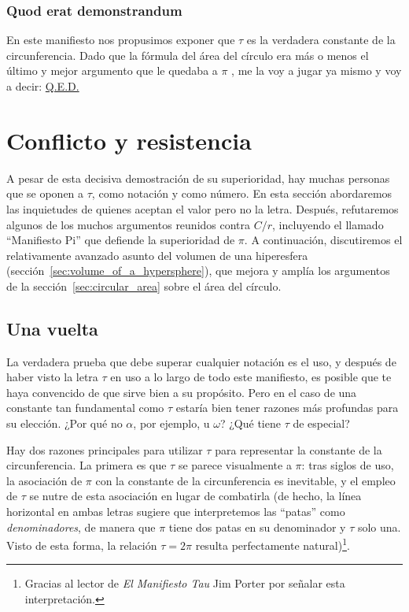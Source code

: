     \subsubsection{Quod erat demonstrandum} %
    \label{sec:quod_erat_demonstrandum}

En este manifiesto nos propusimos exponer que $\tau$ es la verdadera constante de la circunferencia. Dado que la fórmula del área del círculo era más o menos el último y mejor argumento que le quedaba a $\pi$ , me la voy a jugar ya mismo y voy a decir: \href{https://es.wikipedia.org/wiki/Quod_erat_demonstrandum}{Q.E.D.}



\section{Conflicto y resistencia} %
\label{sec:conflict_and_resistance}

A pesar de esta decisiva demostración de su superioridad, hay muchas personas que se oponen a $\tau$, como notación y como número. En esta sección abordaremos las inquietudes de quienes aceptan el valor pero no la letra. Después, refutaremos algunos de los muchos argumentos reunidos contra $C/r$, incluyendo el llamado ``Manifiesto Pi'' que defiende la superioridad de $\pi$. A continuación, discutiremos el relativamente avanzado asunto del volumen de una hiperesfera (sección~\ref{sec:volume_of_a_hypersphere}), que mejora y amplía los argumentos de la sección~\ref{sec:circular_area} sobre el área del círculo.

  \subsection{Una vuelta} %
  \label{sec:one_turn}

La verdadera prueba que debe superar cualquier notación es el uso, y después de haber visto la letra $\tau$ en uso a lo largo de todo este manifiesto, es posible que te haya convencido de que sirve bien a su propósito. Pero en el caso de una constante tan fundamental como $\tau$ estaría bien tener razones más profundas para su elección. ¿Por qué no $\alpha$, por ejemplo, u $\omega$? ¿Qué tiene $\tau$ de especial?

Hay dos razones principales para utilizar $\tau$ para representar la constante de la circunferencia. La primera es que $\tau$ se parece visualmente a $\pi$: tras siglos de uso, la asociación de $\pi$ con la constante de la circunferencia es inevitable, y el empleo de $\tau$ se nutre de esta asociación en lugar de combatirla (de hecho, la línea horizontal en ambas letras sugiere que interpretemos las ``patas'' como \emph{denominadores}, de manera que $\pi$ tiene dos patas en su denominador y $\tau$ solo una. Visto de esta forma, la relación $\tau = 2\pi$ resulta perfectamente natural)\footnote{Gracias al lector de \emph{El Manifiesto Tau} Jim Porter por señalar esta interpretación.}.

